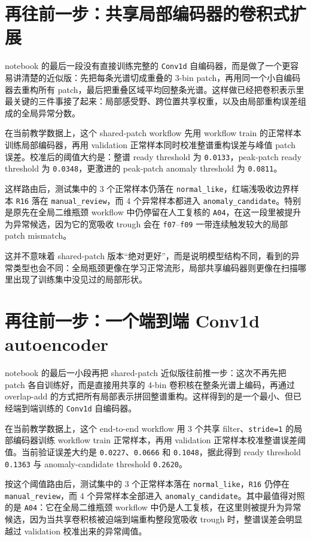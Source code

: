\section{再往前一步：共享局部编码器的卷积式扩展}

notebook 的最后一段没有直接训练完整的 \texttt{Conv1d} 自编码器，而是做了一个更容易讲清楚的近似版：先把每条光谱切成重叠的 3-bin patch，再用同一个小自编码器去重构所有 patch，最后把重叠区域平均回整条光谱。这样做已经把卷积表示里最关键的三件事接了起来：局部感受野、跨位置共享权重，以及由局部重构误差组成的全局异常分数。

在当前教学数据上，这个 shared-patch workflow 先用 workflow train 的正常样本训练局部编码器，再用 validation 正常样本同时校准整谱重构误差与峰值 patch 误差。校准后的阈值大约是：整谱 ready threshold 为 \texttt{0.0133}，peak-patch ready threshold 为 \texttt{0.0348}，更激进的 peak-patch anomaly threshold 为 \texttt{0.0811}。

这样路由后，测试集中的 3 个正常样本仍落在 \texttt{normal\_like}，红端浅吸收边界样本 \texttt{R16} 落在 \texttt{manual\_review}，而 4 个异常样本都进入 \texttt{anomaly\_candidate}。特别是原先在全局二维瓶颈 workflow 中仍停留在人工复核的 \texttt{A04}，在这一段里被提升为异常候选，因为它的宽吸收 trough 会在 \texttt{f07}--\texttt{f09} 一带连续触发较大的局部 patch mismatch。

这并不意味着 shared-patch 版本“绝对更好”，而是说明模型结构不同，看到的异常类型也会不同：全局瓶颈更像在学习正常流形，局部共享编码器则更像在扫描哪里出现了训练集中没见过的局部形状。

\section{再往前一步：一个端到端 Conv1d autoencoder}

notebook 的最后一小段再把 shared-patch 近似版往前推一步：这次不再先把 patch 各自训练好，而是直接用共享的 4-bin 卷积核在整条光谱上编码，再通过 overlap-add 的方式把所有局部表示拼回整谱重构。这样得到的是一个最小、但已经端到端训练的 \texttt{Conv1d} 自编码器。

在当前教学数据上，这个 end-to-end workflow 用 3 个共享 filter、\texttt{stride=1} 的局部编码器训练 workflow train 正常样本，再用 validation 正常样本校准整谱误差阈值。当前验证误差大约是 \texttt{0.0227}、\texttt{0.0666} 和 \texttt{0.1048}，据此得到 ready threshold \texttt{0.1363} 与 anomaly-candidate threshold \texttt{0.2620}。

按这个阈值路由后，测试集中的 3 个正常样本落在 \texttt{normal\_like}，\texttt{R16} 仍停在 \texttt{manual\_review}，而 4 个异常样本全部进入 \texttt{anomaly\_candidate}。其中最值得对照的是 \texttt{A04}：它在全局二维瓶颈 workflow 中仍是人工复核，在这里则被提升为异常候选，因为当共享卷积核被迫端到端重构整段宽吸收 trough 时，整谱误差会明显越过 validation 校准出来的异常阈值。

